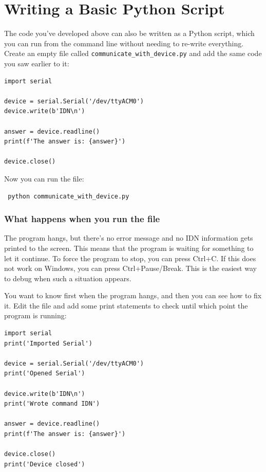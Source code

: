 \section{Writing a Basic Python Script}\label{sec:basic-python-script}
The code you've developed above can also be written as a Python script, which you can run from the command line without needing to re-write everything. Create an empty file called \texttt{communicate\_with\_device.py} and add the same code you saw earlier to it:

\begin{verbatim}
import serial

device = serial.Serial('/dev/ttyACM0')
device.write(b'IDN\n')

answer = device.readline()
print(f'The answer is: {answer}')

device.close()
\end{verbatim}

Now you can run the file:

\begin{verbatim}
 python communicate_with_device.py
\end{verbatim}


\subsubsection{What happens when you run the file}

The program hangs, but there's no error message and no IDN information gets printed to the screen. This means that the program is waiting for something to let it continue. To force the program to stop, you can press Ctrl+C. If this does not work on Windows, you can press Ctrl+Pause/Break. This is the easiest way to debug when such a situation appears.

You want to know first when the program hangs, and then you can see how to fix it. Edit the file and add some print statements to check until which point the program is running:

\begin{verbatim}
import serial
print('Imported Serial')

device = serial.Serial('/dev/ttyACM0')
print('Opened Serial')

device.write(b'IDN\n')
print('Wrote command IDN')

answer = device.readline()
print(f'The answer is: {answer}')

device.close()
print('Device closed')
\end{verbatim}


